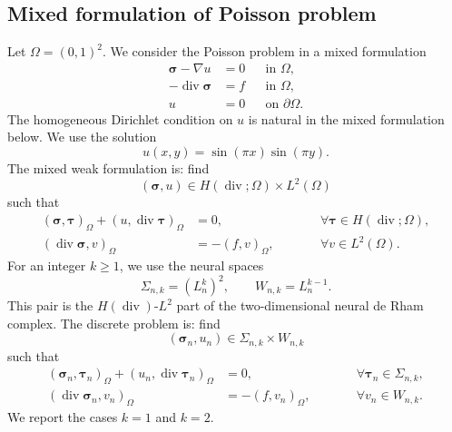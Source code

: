 \documentclass[pdflatex,sn-mathphys-num]{sn-jnl}
\numberwithin{equation}{section}
\numberwithin{theorem}{section}
\numberwithin{table}{section}
\numberwithin{figure}{section}
\begin{document}
\subsection{Mixed formulation of Poisson problem}
\label{subsec:mixed-poisson}

Let \(\Omega=(0,1)^2\).  We consider the  Poisson problem in a mixed formulation
\begin{equation}
\label{eq:mixed-poisson-strong}
    \begin{aligned}
       \boldsymbol{\sigma}-\nabla u &=0
       &&\text{in }\Omega,\\
       -\operatorname{div}\boldsymbol{\sigma} &= f
       &&\text{in }\Omega,\\
       u &=0
       &&\text{on }\partial\Omega .
    \end{aligned}
\end{equation}
The homogeneous Dirichlet condition on \(u\) is natural in the mixed formulation below. We use the solution
\[
    u(x,y)=\sin(\pi x)\sin(\pi y).
\]
The mixed weak formulation is: find
\[
    (\boldsymbol{\sigma},u)\in H(\operatorname{div};\Omega)\times L^2(\Omega)
\]
such that
\begin{equation}
\label{eq:mixed-poisson-weak}
\begin{aligned}
    (\boldsymbol{\sigma},\boldsymbol{\tau})_{\Omega}
    +(u,\operatorname{div}\boldsymbol{\tau})_{\Omega}&=0,
    \qquad
    &&\forall \boldsymbol{\tau}\in H(\operatorname{div};\Omega),\\
    (\operatorname{div}\boldsymbol{\sigma},v)_{\Omega}
    &=-(f,v)_{\Omega},
    \qquad
    &&\forall v\in L^2(\Omega).
    \end{aligned}
\end{equation}
For an integer \(k\ge 1\), we use the neural spaces
\[
    \Sigma_{n,k}=(L_n^k)^2,
    \qquad
    W_{n,k}=L_n^{k-1}.
\]
This pair is the \(H(\operatorname{div})\)-\(L^2\) part of the two-dimensional neural de Rham complex. The discrete problem is: find
\[
    (\boldsymbol{\sigma}_{n},u_n)\in \Sigma_{n,k}\times W_{n,k}
\]
such that
\begin{equation}
\label{eq:mixed-poisson-discrete}
\begin{aligned}
    (\boldsymbol{\sigma}_{n},\boldsymbol{\tau}_{n})_{\Omega}
    +(u_n,\operatorname{div}\boldsymbol{\tau}_{n})_{\Omega}&=0,
    \qquad
    &&\forall \boldsymbol{\tau}_{n}\in \Sigma_{n,k},\\
    (\operatorname{div}\boldsymbol{\sigma}_{n},v_n)_{\Omega}
    &=-(f,v_n)_{\Omega},
    \qquad
    &&\forall v_n\in W_{n,k}.
        \end{aligned}
\end{equation}
We report the cases \(k=1\) and \(k=2\).
\end{document}
